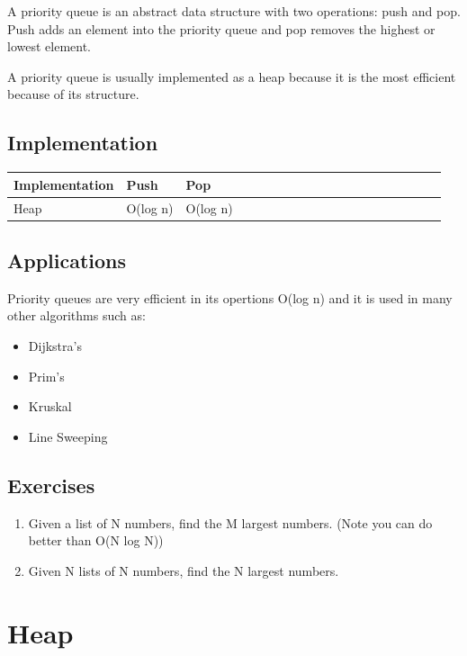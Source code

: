 \documentclass[11pt,oneside]{book}
\begin{document}
A priority queue is an abstract data structure with two operations: push and pop. Push adds an element into the priority queue and pop removes the highest or lowest element.

A priority queue is usually implemented as a heap because it is the most efficient because of its structure.

\subsection{Implementation}

\vspace{10px}\begin{tabulary}{0.4\linewidth}{|l|l|l|l|l|l|l|l|l|l|l|l|l|l|l|l|l|l|l}\hline


  Implementation &
  Push &
  Pop\\
\hline


  Heap &
  O(log n) &
  O(log n)\\

\hline\end{tabulary}

\subsection{Applications}

Priority queues are very efficient in its opertions O(log n) and it is used in many other algorithms such as:

\begin{itemize}
\item Dijkstra's
\item Prim's
\item Kruskal
\item Line Sweeping
\end{itemize}

\subsection{Exercises}

\begin{enumerate}
\item Given a list of N numbers, find the M largest numbers. (Note you can do better than O(N log N))
\item Given N lists of N numbers, find the N largest numbers.
\end{enumerate}

        \section{ Heap }
        
\end{document}
